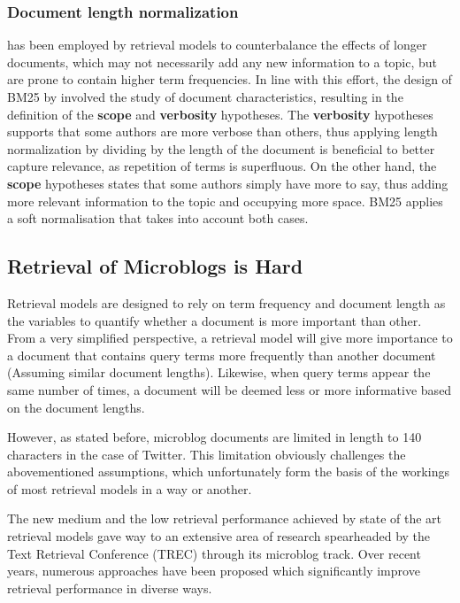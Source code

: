 \subsubsection{Document length normalization} \cite{singhal1996pivoted} has been employed by retrieval models to counterbalance the effects of longer documents, which may not necessarily add any new information to a topic, but are prone to contain higher term frequencies. In line with this effort, the design of BM25 by \cite{robertson2009probabilistic} involved the study of document characteristics, resulting in the definition of the \textbf{scope} and \textbf{verbosity} hypotheses. The \textbf{verbosity} hypotheses supports that some authors are more verbose than others, thus applying length normalization by dividing by the length of the document is beneficial to better capture relevance, as repetition of terms is superfluous. On the other hand, the \textbf{scope} hypotheses states that some authors simply have more to say, thus adding more relevant information to the topic and occupying more space. BM25 applies a soft normalisation that takes into account both cases.

\subsection{Retrieval of Microblogs is Hard}
Retrieval models are designed to rely on term frequency and document length as the variables to quantify whether a document is more important than other. From a very simplified perspective, a retrieval model will give more importance to a document that contains query terms more frequently than another document (Assuming similar document lengths). Likewise, when query terms appear the same number of times, a document will be deemed less or more informative based on the document lengths.

However, as stated before, microblog documents are limited in length to 140 characters in the case of Twitter. This limitation obviously challenges the abovementioned assumptions, which unfortunately form the basis of the workings of most retrieval models in a way or another.

The new medium and the low retrieval performance achieved by state of the art retrieval models gave way to an extensive area of research spearheaded by the Text Retrieval Conference (TREC) through its microblog track. Over recent years, numerous approaches have been proposed which significantly improve retrieval performance in diverse ways.

